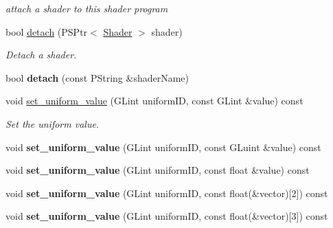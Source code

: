 \begin{DoxyCompactItemize}
\begin{DoxyCompactList}\small\item\em attach a shader to this shader program \end{DoxyCompactList}\item 
bool \mbox{\hyperlink{classprz_1_1_shader___program_ac0a5e9ee801dc29757beb391fb9ee9ca}{detach}} (P\+S\+Ptr$<$ \mbox{\hyperlink{classprz_1_1_shader}{Shader}} $>$ shader)
\begin{DoxyCompactList}\small\item\em Detach a shader. \end{DoxyCompactList}\item 
\mbox{\label{classprz_1_1_shader___program_a0e15d02294b03f004553f468214bab2f}} 
bool {\bfseries detach} (const P\+String \&shader\+Name)
\item 
void \mbox{\hyperlink{classprz_1_1_shader___program_a1e7289d620dc9a4567b3b5c51aed4d58}{set\+\_\+uniform\+\_\+value}} (G\+Lint uniform\+ID, const G\+Lint \&value) const
\begin{DoxyCompactList}\small\item\em Set the uniform value. \end{DoxyCompactList}\item 
\mbox{\label{classprz_1_1_shader___program_a74cbcfed26915f2fb9f96a13eff8a525}} 
void {\bfseries set\+\_\+uniform\+\_\+value} (G\+Lint uniform\+ID, const G\+Luint \&value) const
\item 
\mbox{\label{classprz_1_1_shader___program_a29ccc5851de28b34a53acb9c3866376f}} 
void {\bfseries set\+\_\+uniform\+\_\+value} (G\+Lint uniform\+ID, const float \&value) const
\item 
\mbox{\label{classprz_1_1_shader___program_a9dc3dc8143a66d57b57782f5ccefc261}} 
void {\bfseries set\+\_\+uniform\+\_\+value} (G\+Lint uniform\+ID, const float(\&vector)\mbox{[}2\mbox{]}) const
\item 
\mbox{\label{classprz_1_1_shader___program_a0aa48b066daf7ee3a25bddfd85d0429d}} 
void {\bfseries set\+\_\+uniform\+\_\+value} (G\+Lint uniform\+ID, const float(\&vector)\mbox{[}3\mbox{]}) const
\item 
\mbox{\label{classprz_1_1_shader___program_a2602c0a1a00c14d164cc8a2ed8d9ae8c}} 

\end{DoxyCompactItemize}
